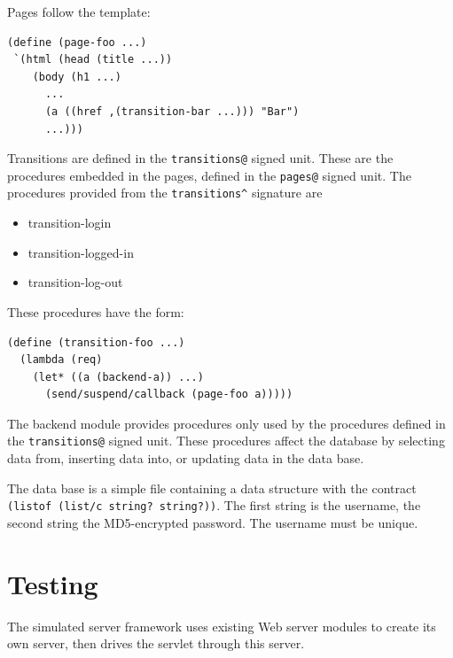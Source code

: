 \documentclass{article}
\begin{document}
Pages follow the template:

\begin{verbatim}
(define (page-foo ...)
 `(html (head (title ...))
    (body (h1 ...)
      ...
      (a ((href ,(transition-bar ...))) "Bar")
      ...)))
\end{verbatim}

Transitions are defined in the \verb|transitions@| signed unit. These are the
procedures embedded in the pages, defined in the \verb|pages@| signed unit. The
procedures provided from the \verb|transitions^| signature are
\begin{itemize}
\item{transition-login}
\item{transition-logged-in}
\item{transition-log-out}
\end{itemize}

These procedures have the form:

\begin{verbatim}
(define (transition-foo ...)
  (lambda (req)
    (let* ((a (backend-a)) ...)
      (send/suspend/callback (page-foo a)))))
\end{verbatim}


The backend module provides procedures only used by the procedures defined in
the \verb|transitions@| signed unit. These procedures affect the database by
selecting data from, inserting data into, or updating data in the data base.

The data base is a simple file containing a data structure with the contract
\verb|(listof (list/c string? string?))|. The first string is the username, the
second string the MD5-encrypted password. The username must be unique.


\section{Testing}\label{sec:tests}

The simulated server framework uses existing Web server modules to create its
own server, then drives the servlet through this server.
\end{document}
